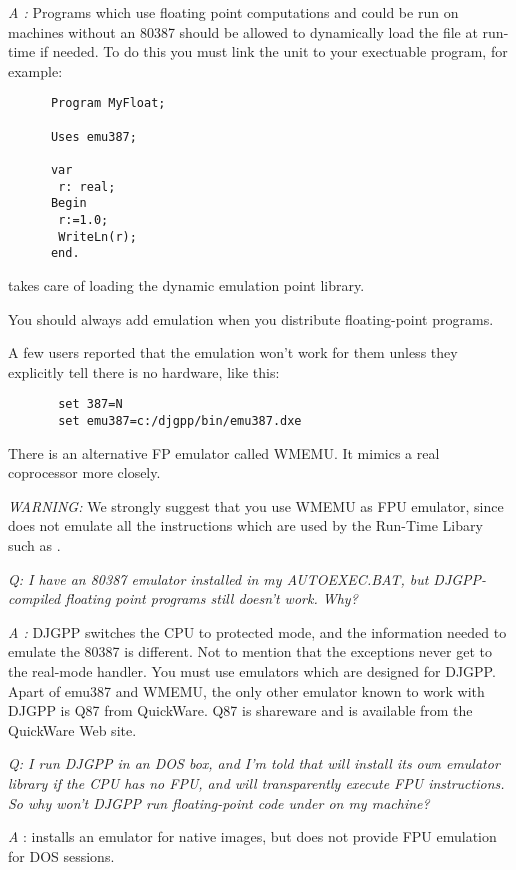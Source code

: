 \documentclass{report}
\begin{document}
{\em A :}
 Programs which use floating point computations and could be run on
   machines without an 80387 should be allowed to dynamically load the
   file at run-time if needed. To do this you must link the  unit to your
   exectuable program, for example:

\begin{verbatim}
      Program MyFloat;

      Uses emu387;

      var
       r: real;
      Begin
       r:=1.0;
       WriteLn(r);
      end.
\end{verbatim}

    takes care of loading the dynamic emulation point library.

   You should always add emulation when you distribute floating-point
   programs.

   A few users reported that the emulation won't work for them unless
   they explicitly tell  there is no  hardware, like this:

\begin{verbatim}
       set 387=N
       set emu387=c:/djgpp/bin/emu387.dxe
\end{verbatim}

   There is an alternative FP emulator called WMEMU. It mimics a real
   coprocessor more closely.

   {\em WARNING:} We strongly suggest that you use WMEMU as FPU emulator, since
    does not emulate all the instructions which are used by the
   Run-Time Libary such as .


{\em   Q: I have an 80387 emulator installed in my AUTOEXEC.BAT, but
   DJGPP-compiled floating point programs still doesn't work. Why?
}


{\em   A :} DJGPP switches the CPU to protected mode, and the information
   needed to emulate the 80387 is different. Not to mention that the
   exceptions never get to the real-mode handler. You must use emulators
   which are designed for DJGPP. Apart of emu387 and WMEMU, the only
   other emulator known to work with DJGPP is Q87 from QuickWare. Q87 is
   shareware and is available from the QuickWare Web site.


{\em   Q: I run DJGPP in an \ostwo DOS box, and I'm told that \ostwo will install
   its own emulator library if the CPU has no FPU, and will transparently
   execute FPU instructions. So why won't DJGPP run floating-point code
   under \ostwo on my machine?
}

{\em   A} : \ostwo installs an emulator for native \ostwo images, but does not
   provide FPU emulation for DOS sessions.
\end{document}
